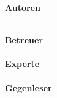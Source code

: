 \begin{titlepage}
	\begin{minipage}{\linewidth}
		

	\end{minipage}
	
	\begin{minipage}{\linewidth}
	\begin{minipage}[t]{0.33\linewidth}
		\Large \textbf{Autoren} \\
		\Large \sadf \\
		\Large \fbif
	\end{minipage}
	\hfill\begin{minipage}[t]{0.5\linewidth}
		\Large \textbf{Betreuer} \\
		\Large \ibuf \\
		\textbf{\Large Experte}\\
		\Large \daff \\
		\textbf{\Large Gegenleser}\\
		\Large \arif
	\end{minipage}
	\end{minipage}



\end{titlepage}

\restoregeometry
